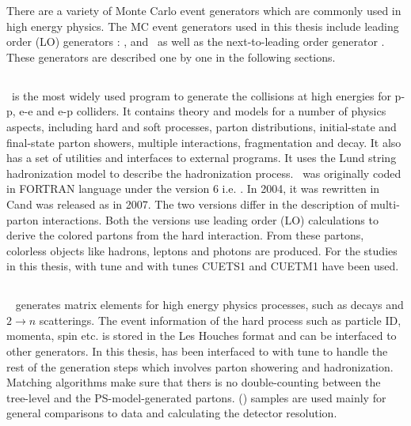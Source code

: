 There are a variety of Monte Carlo event generators which are commonly used in high energy physics. The MC event generators used in this thesis include leading order (LO) generators : \PYTHIA, \MadGraphF and \HERWIG~as well as the next-to-leading order generator \POWHEG. These generators are described one by one in the following sections.

\subsection{\PYTHIA}
\PYTHIA~is the most widely used program to generate the collisions at high energies for p-p, e-e and e-p colliders. It contains theory and models for a number of physics aspects, including hard and soft processes, parton distributions, initial-state and final-state parton showers, multiple interactions, fragmentation and decay. It also has a set of utilities and interfaces to external programs. It uses the Lund string hadronization model \cite{Lund} to describe the hadronization process. \PYTHIA~was originally coded in FORTRAN language under the version 6 i.e. \PYTHIAS \cite{Sjostrand:2006za}. In 2004, it was rewritten in C\plusn\plus and was released as \PYTHIAE \cite{Sjostrand:2007gs} in 2007. The two versions differ in the description of multi-parton interactions. Both the versions use leading order (LO) calculations to derive the colored partons from the hard interaction. From these partons, colorless objects like hadrons, leptons and photons are produced. For the studies in this thesis, \PYTHIAS with tune \Ztwostar \cite{Field:2011iq} and \PYTHIAE with tunes CUETS1 and CUETM1 \cite{Khachatryan:2015pea} have been used. 

\subsection{\MadGraphF}
\MadGraphF~\cite{Alwall:2011uj} generates matrix elements for high energy physics processes, such as decays and $2 \rightarrow n$ scatterings. The event information of the hard process such as particle ID, momenta, spin etc. is stored in the Les Houches format \cite{Alwall:2006yp} and can be interfaced to other generators. In this thesis, \MadGraphF has been interfaced to \PYTHIAS with tune \Ztwostar to handle the rest of the generation steps which involves parton showering and hadronization. Matching algorithms make sure that thers is no double-counting between the tree-level and the PS-model-generated partons. \MadGraphFn\plusn \PYTHIAS (\MGP) samples are used mainly for general comparisons to data and calculating the detector resolution. 

